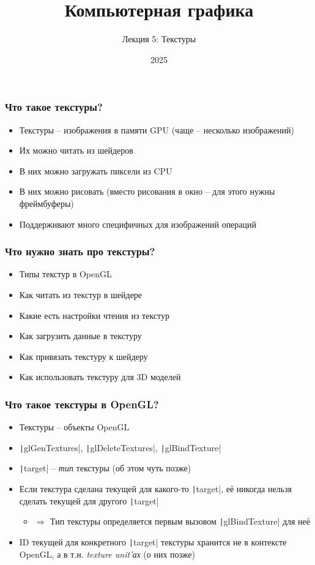 \documentclass[10pt]{beamer}
\title{Компьютерная графика}
\subtitle{Лекция 5: Текстуры}
\date{2025}
\begin{document}
\frame{\titlepage}

\begin{frame}[fragile]
\frametitle{Что такое текстуры?}
\begin{itemize}
\item Текстуры -- изображения в памяти GPU (чаще -- несколько изображений)
\pause
\item Их можно читать из шейдеров
\pause
\item В них можно загружать пиксели из CPU
\pause
\item В них можно рисовать (вместо рисования в окно -- для этого нужны фреймбуферы)
\pause
\item Поддерживают много специфичных для изображений операций
\end{itemize}
\end{frame}

\begin{frame}[fragile]
\frametitle{Что нужно знать про текстуры?}
\begin{itemize}
\item Типы текстур в OpenGL
\pause
\item Как читать из текстур в шейдере
\pause
\item Какие есть настройки чтения из текстур
\pause
\item Как загрузить данные в текстуру
\pause
\item Как привязать текстуру к шейдеру
\pause
\item Как использовать текстуру для 3D моделей
\end{itemize}
\end{frame}

\begin{frame}[fragile]
\frametitle{Что такое текстуры в OpenGL?}
\begin{itemize}
\item Текстуры -- объекты OpenGL
\pause
\item \texttt|glGenTextures|, \texttt|glDeleteTextures|, \texttt|glBindTexture|
\pause
\item \texttt|target| -- \textit{тип} текстуры (об этом чуть позже)
\pause
\item Если текстура сделана текущей для какого-то \texttt|target|, её никогда нельзя сделать текущей для другого \texttt|target|
\begin{itemize}
\item \begin{math}\Longrightarrow\end{math} Тип текстуры определяется первым вызовом \texttt|glBindTexture| для неё
\end{itemize}
\pause
\item ID текущей для конкретного \texttt|target| текстуры хранится не в контексте OpenGL, а в т.н. \textit{texture unit'ах} (о них позже)
\end{itemize}
\end{frame}
\end{document}
